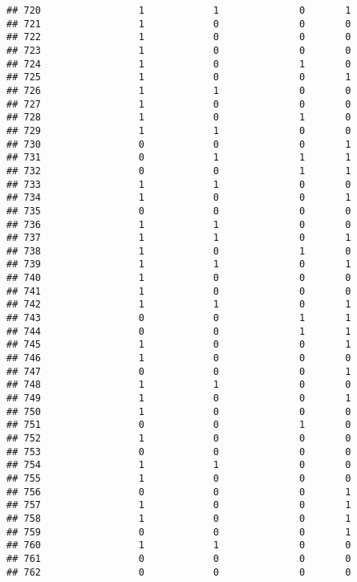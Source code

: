 \documentclass[]{article}
\begin{document}
\begin{verbatim}
## 720                 1            1              0       1
## 721                 1            0              0       0
## 722                 1            0              0       0
## 723                 1            0              0       0
## 724                 1            0              1       0
## 725                 1            0              0       1
## 726                 1            1              0       0
## 727                 1            0              0       0
## 728                 1            0              1       0
## 729                 1            1              0       0
## 730                 0            0              0       1
## 731                 0            1              1       1
## 732                 0            0              1       1
## 733                 1            1              0       0
## 734                 1            0              0       1
## 735                 0            0              0       0
## 736                 1            1              0       0
## 737                 1            1              0       1
## 738                 1            0              1       0
## 739                 1            1              0       1
## 740                 1            0              0       0
## 741                 1            0              0       0
## 742                 1            1              0       1
## 743                 0            0              1       1
## 744                 0            0              1       1
## 745                 1            0              0       1
## 746                 1            0              0       0
## 747                 0            0              0       1
## 748                 1            1              0       0
## 749                 1            0              0       1
## 750                 1            0              0       0
## 751                 0            0              1       0
## 752                 1            0              0       0
## 753                 0            0              0       0
## 754                 1            1              0       0
## 755                 1            0              0       0
## 756                 0            0              0       1
## 757                 1            0              0       1
## 758                 1            0              0       1
## 759                 0            0              0       1
## 760                 1            1              0       0
## 761                 0            0              0       0
## 762                 0            0              0       0

\end{verbatim}
\end{document}
